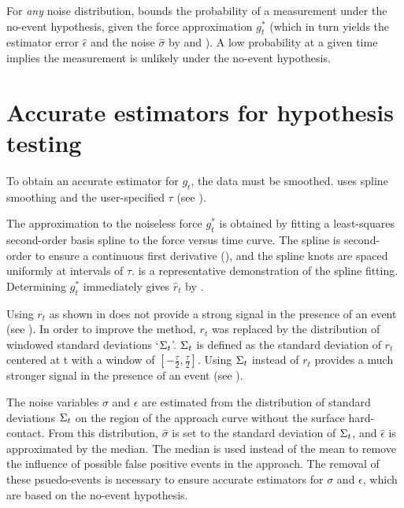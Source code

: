 

For \emph{any} noise distribution,  bounds the probability of a measurement under the no-event hypothesis, given the force approximation $g^{*}_t$ (which in turn yields the estimator error $\hat{\epsilon}$ and the noise $\hat{\sigma}$ by  and ). A low probability at a given time implies the measurement is unlikely under the no-event hypothesis. 

\section{Accurate estimators for hypothesis testing}

To obtain an accurate estimator for $g_t$, the data must be smoothed. \name{} uses spline smoothing and the user-specified $\tau$ (see ).  

The approximation to the noiseless force $g^{*}_t$ is obtained by fitting a least-squares second-order basis spline to the force versus time curve. The spline is second-order to ensure a continuous first derivative (), and the spline knots are spaced uniformly at intervals of $\tau$.  is a representative demonstration of the spline fitting. Determining  $g^{*}_t$ immediately gives $\hat{r}_t$ by  .

Using $r_t$ as shown in  does not provide a strong signal in the presence of an event (see ). In order to improve the method, $r_t$ was replaced by the distribution of windowed standard deviations `$\Sigma_t$'. $\Sigma_t$ is defined as the standard deviation of $r_t$ centered at t with a window of $[-\frac{\tau}{2},\frac{\tau}{2}]$. Using $\Sigma_t$ instead of $r_t$ provides a much stronger signal in the presence of an event (see ).  

The noise variables $\sigma$ and $\epsilon$ are estimated from the distribution of standard deviations $\Sigma_t$ on the region of the approach curve without the surface hard-contact. From this distribution, $\hat{\sigma}$ is set to the standard deviation of $\Sigma_t$, and $\hat{\epsilon}$ is approximated by the median. The median is used instead of the mean to remove the influence of possible false positive events in the approach. The removal of these psuedo-events is necessary to ensure accurate estimators for $\sigma$ and $\epsilon$, which are based on the no-event hypothesis. 

